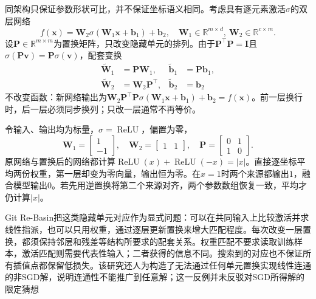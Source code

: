 同架构只保证参数形状可比，并不保证坐标语义相同。考虑具有逐元素激活$\sigma$的双层网络
\[
  f(\bm{x})=\bm{W}_2\sigma(\bm{W}_1\bm{x}+\bm{b}_1)+\bm{b}_2,
  \quad \bm{W}_1\in\mathbb{R}^{m\times d},\
  \bm{W}_2\in\mathbb{R}^{c\times m}.
\]
设$\bm{P}\in\mathbb{R}^{m\times m}$为置换矩阵，只改变隐藏单元的排列。由于$\bm{P}^{\top}\bm{P}=\bm{I}$且$\sigma(\bm{P}\bm{v})=\bm{P}\sigma(\bm{v})$，配套变换
\begin{equation}
  \begin{aligned}
    \widetilde{\bm{W}}_1&=\bm{P}\bm{W}_1,&
    \widetilde{\bm{b}}_1&=\bm{P}\bm{b}_1,\\
    \widetilde{\bm{W}}_2&=\bm{W}_2\bm{P}^{\top},&
    \widetilde{\bm{b}}_2&=\bm{b}_2
  \end{aligned}
  \label{eq:ket-integration-permutation}
\end{equation}
不改变函数：新网络输出为$\bm{W}_2\bm{P}^{\top}\bm{P}\sigma(\bm{W}_1\bm{x}+\bm{b}_1)+\bm{b}_2=f(\bm{x})$。前一层换行时，后一层必须同步换列；只改一层通常不再等价。

\begin{example}[完全相同的函数也不能直接平均]
  \label{ex:ket-integration-permutation}
  令输入、输出均为标量，$\sigma=\operatorname{ReLU}$，偏置为零，
  \[
    \bm{W}_1=\begin{bmatrix}1\\-1\end{bmatrix},\quad
    \bm{W}_2=\begin{bmatrix}1&1\end{bmatrix},\quad
    \bm{P}=\begin{bmatrix}0&1\\1&0\end{bmatrix}.
  \]
  原网络与置换后的网络都计算$\operatorname{ReLU}(x)+\operatorname{ReLU}(-x)=|x|$。直接逐坐标平均两份权重，第一层却变为零向量，输出恒为零。在$x=1$时两个来源都输出$1$，融合模型输出$0$。若先用逆置换将第二个来源对齐，两个参数数组恢复一致，平均才仍计算$|x|$。
\end{example}

Git Re-Basin把这类隐藏单元对应作为显式问题：可以在共同输入上比较激活并求线性指派，也可以只用权重，通过逐层更新置换来增大匹配程度。每次改变一层置换，都须保持邻层和残差等结构所要求的配套关系。权重匹配不要求读取训练样本，激活匹配则需要代表性输入；二者获得的信息不同。搜索到的对应也不保证所有插值点都保留低损失。该研究还人为构造了无法通过任何单元置换实现线性连通的非SGD解，说明连通性不能推广到任意解；这一反例并未反驳对SGD所得解的限定猜想

